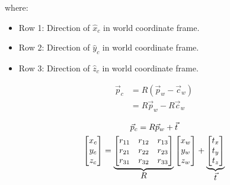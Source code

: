 \noindent where:
\begin{itemize}
    \item Row 1: Direction of $\hat{x}_c$ in world coordinate frame.
    \item Row 2: Direction of $\hat{y}_c$ in world coordinate frame.
    \item Row 3: Direction of $\hat{z}_c$ in world coordinate frame.
\end{itemize}

\noindent

\begin{subequations}
    \begin{align}
        \vec{p}_c & = R(\vec{p}_w-\vec{c}_w) \\
                  & = R\vec{p}_w -R\vec{c}_w
    \end{align}
\end{subequations}



\begin{gather}
    \vec{p}_c = R\vec{p}_w + \vec{t} \\
    \begin{bmatrix}
        x_c \\ y_c \\ z_c
    \end{bmatrix}
    =
    \underbrace{
        \begin{bmatrix}
            r_{11} & r_{12} & r_{13} \\
            r_{21} & r_{22} & r_{23} \\
            r_{31} & r_{32} & r_{33}
        \end{bmatrix}
    }_{\mathlarger{R}}
    \begin{bmatrix}
        x_w \\ y_w \\ z_w
    \end{bmatrix}
    +
    \underbrace{
        \begin{bmatrix}
            t_x \\ t_y \\ t_z
        \end{bmatrix}
    }_{\mathlarger{\vec{t}}}
\end{gather}


